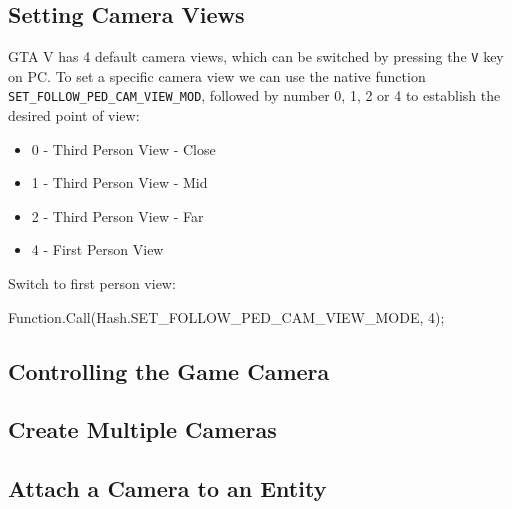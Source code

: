 \documentclass[
  openany]{book}
\newenvironment{Shaded}{\begin{snugshade}}{\end{snugshade}}
\newcommand{\DecValTok}[1]{\textcolor[rgb]{0.00,0.00,0.81}{#1}}
\newcommand{\FunctionTok}[1]{\textcolor[rgb]{0.00,0.00,0.00}{#1}}
\newcommand{\NormalTok}[1]{#1}
\providecommand{\tightlist}{%
  \setlength{\itemsep}{0pt}\setlength{\parskip}{0pt}}
\begin{document}
\hypertarget{setting-camera-views}{%
\subsection*{Setting Camera Views}\label{setting-camera-views}}

GTA V has 4 default camera views, which can be switched by pressing the \texttt{V} key on PC.
To set a specific camera view we can use the native function \texttt{SET\_FOLLOW\_PED\_CAM\_VIEW\_MOD}, followed by number 0, 1, 2 or 4 to establish the desired point of view:

\begin{itemize}
\tightlist
\item
  0 - Third Person View - Close
\item
  1 - Third Person View - Mid
\item
  2 - Third Person View - Far
\item
  4 - First Person View
\end{itemize}

Switch to first person view:

\begin{Shaded}
\begin{Highlighting}[]
\NormalTok{Function.}\FunctionTok{Call}\NormalTok{(Hash.}\FunctionTok{SET_FOLLOW_PED_CAM_VIEW_MODE}\NormalTok{, }\DecValTok{4}\NormalTok{); }
\end{Highlighting}
\end{Shaded}

\hypertarget{controlling-the-game-camera}{%
\subsection*{Controlling the Game Camera}\label{controlling-the-game-camera}}

\hypertarget{create-multiple-cameras}{%
\subsection*{Create Multiple Cameras}\label{create-multiple-cameras}}

\hypertarget{attach-a-camera-to-an-entity}{%
\subsection*{Attach a Camera to an Entity}\label{attach-a-camera-to-an-entity}}
\end{document}

